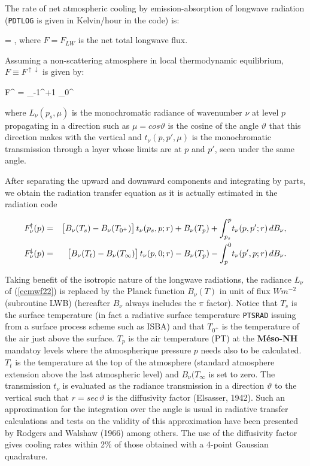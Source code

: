 The rate of net atmospheric cooling by emission-absorption of longwave radiation
({\tt PDTLOG} is given in Kelvin/hour in the code) is:

\medskip
\be
{} =  ,
\label{ecmwf21}
\ee
\medskip
\noindent where $F=F_{LW}$ is the net total longwave flux.

%

Assuming a non-scattering atmosphere in local thermodynamic equilibrium,
$F \equiv F^{\!\uparrow\!\downarrow}$ is given by:

\medskip
\be
F^{\!\uparrow\!\downarrow} = \int_{-1}^{+1} \int_0^
\label{ecmwf22}
\ee
\medskip

where $L_{\nu}(p_s,\mu)$ is the monochromatic radiance of wavenumber
$\nu$ at level $p$ propagating in a direction such as $\mu =
cos\vartheta $ is the cosine of the angle
$\vartheta $ that this direction makes with the vertical and
$t_{\nu}(p,p',\mu)$ is the monochromatic transmission through a layer
whose limits are at $p$ and $p'$, seen under the same angle.

After separating the upward and downward components and integrating by parts,
we obtain the radiation transfer equation as it is actually estimated in the
radiation code

\medskip
\begin{eqnarray}\label{ecmwf23}
F_{\nu}^{\!\uparrow}(p) &=&
\bigl[B_{\nu}(T_s) - B_{\nu}(T_{0^{+}})\bigr] \, t_{\nu}(p_s,p;r)
+ B_{\nu}(T_p) + \int_{p_s}^p \! {t_{\nu}(p,p';r) \, dB_{\nu}}, \cr
F_{\nu}^{\!\downarrow}(p) &=&
\bigl[B_{\nu}(T_t) - B_{\nu}(T_{\infty})\bigr] \, t_{\nu}(p,0;r)
- B_{\nu}(T_p) - \int_{p}^0 \! {t_{\nu}(p',p;r) \, dB_{\nu}}.
\end{eqnarray}
\medskip

Taking benefit of the isotropic nature of the longwave radiations,
the radiance $L_{\nu}$ of (\ref{ecmwf22}) is replaced by the Planck function
$B_{\nu}(T)$ in unit of flux $W m^{-2}$ (subroutine LWB) (hereafter
$B_{\nu}$ always includes the $\pi$ factor).  Notice that $T_s$ is the surface
temperature (in fact a radiative surface temperature {\tt PTSRAD} issuing from
a surface process scheme such as ISBA) and that $T_{0^{+}}$ is the temperature
of the air just above the surface. $T_{p}$ is the air temperature (PT) at the
{\bf M\'eso-NH} mandatoy levels where the atmospherique pressure $p$ needs also
to be calculated. $T_t$ is the temperature at the top of the atmosphere
(standard atmosphere extension above the last atmospheric level) and
$B_{\nu}(T_{\infty}$ is set to zero. The transmission $t_{\nu}$ is evaluated as
the radiance transmission in a direction $\vartheta $ to the vertical such
that $r = sec \, \vartheta $ is the diffusivity factor (Elsasser, 1942).
Such an approximation for the integration over the angle is usual in
radiative transfer calculations and tests on the validity of this
approximation have been presented by Rodgers and Walshaw (1966) among
others.  The use of the diffusivity factor gives cooling rates within
2\% of those obtained with a 4-point Gaussian quadrature.

